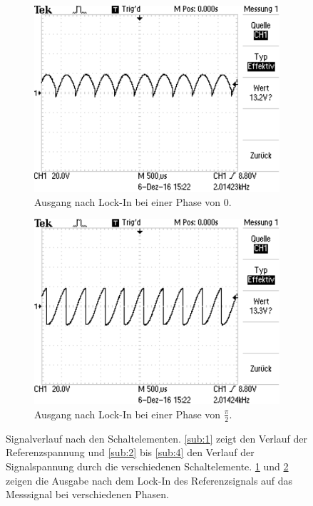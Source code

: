 \begin{figure}
\begin{subfigure}{0.45\textwidth}
    \includegraphics[width=\textwidth]{5.png}
    \caption{Ausgang nach Lock-In bei einer Phase von \num{0}.}
    \label{sub:5}
    \qquad
  \end{subfigure}
  \begin{subfigure}{0.45\textwidth}
    \centering
    \includegraphics[width=\textwidth]{6.png}
    \caption{Ausgang nach Lock-In bei einer Phase von $\frac{\si{\pi}}{\num{2}}$.}
    \label{sub:6}
    \qquad
  \end{subfigure}
  \caption{Signalverlauf nach den Schaltelementen. \ref{sub:1} zeigt den Verlauf der Referenzspannung und
  \ref{sub:2} bis \ref{sub:4} den Verlauf der Signalspannung durch die verschiedenen Schaltelemente.
  \ref{sub:5} und \ref{sub:6} zeigen die Ausgabe nach dem Lock-In des Referenzsignals auf das Messsignal bei
  verschiedenen Phasen.}
  \label{fig:5}
\end{figure}
